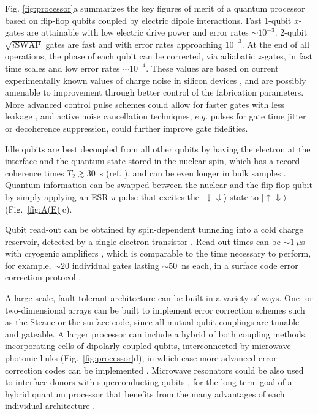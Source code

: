 \documentclass[aps,prb,superscriptaddress,nobibnotes,twocolumn]{revtex4-1}
\begin{document}
\noindent
Fig. \ref{fig:processor}a summarizes the key figures of merit of a quantum processor based on flip-flop qubits coupled by electric dipole interactions. Fast 1-qubit $x$-gates are attainable with low electric drive power and error rates $\sim10^{-3}$. 2-qubit $\sqrt{i\mathrm{SWAP}}$ gates are fast and with error rates approaching $10^{-3}$. At the end of all operations, the phase of each qubit can be corrected, via adiabatic $z$-gates, in fast time scales and low error rates $\sim10^{-4}$. These values are based on current experimentally known values of charge noise in silicon devices \cite{Freeman2016}, and are possibly amenable to improvement through better control of the fabrication parameters. More advanced control pulse schemes could allow for faster gates with less leakage \cite{Motzoi2009,Ghosh2016,Werschnik2007}, and active noise cancellation techniques, $e.g.$ pulses for gate time jitter \cite{Hill2007} or decoherence \cite{Sar2012} suppression, could further improve gate fidelities. 

Idle qubits are best decoupled from all other qubits by having the electron at the interface and the quantum state stored in the nuclear spin, which has a record coherence times $T_2 \gtrsim 30$~s (ref. ), and can be even longer in bulk samples \cite{Saeedi2013}. Quantum information can be swapped between the nuclear and the flip-flop qubit by simply applying an ESR $\pi$-pulse that excites the $\lvert{\downarrow\Downarrow}\rangle$ state to $\lvert{\uparrow\Downarrow}\rangle$ (Fig.~\ref{fig:A(E)}c).

Qubit read-out can be obtained by spin-dependent tunneling into a cold charge reservoir, detected by a single-electron transistor \cite{Morello2010}. Read-out times can be $\sim1~\mu$s with cryogenic amplifiers \cite{Curry2015}, which is comparable to the time necessary to perform, for example, $\sim 20$ individual gates lasting $\sim 50$~ns each, in a surface code error correction protocol \cite{Fowler2012}.

A large-scale, fault-tolerant architecture can be built in a variety of ways. One- or two-dimensional arrays can be built to implement error correction schemes such as the Steane \cite{Steane1996} or the surface \cite{Fowler2012} code, since all mutual qubit couplings are tunable and gateable. A larger processor can include a hybrid of both coupling methods, incorporating cells of dipolarly-coupled qubits, interconnected by microwave photonic links (Fig.~\ref{fig:processor}d), in which case more advanced error-correction codes can be implemented \cite{Knill2005,Nickerson2013,Terhal2015,Li2017}. Microwave resonators could be also used to interface donors with superconducting qubits \cite{Barends2014,Devoret2013}, for the long-term goal of a hybrid quantum processor that benefits from the many advantages of each individual architecture \cite{Xiang2013}.
\end{document}

